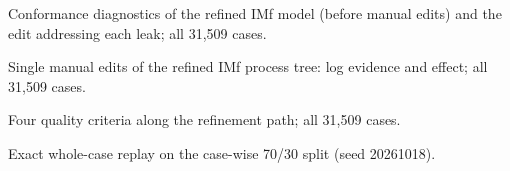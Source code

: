 \begin{table}[t]
\centering
\small
\caption{Conformance diagnostics of the refined IMf model (before manual edits) and the edit addressing each leak; all 31,509 cases.}
\label{tab:conformance-edits}

\end{table}

\begin{table}[t]
\centering
\small
\caption{Single manual edits of the refined IMf process tree: log evidence and effect; all 31,509 cases.}
\label{tab:single-edits}

\end{table}

\begin{table}[t]
\centering
\small
\caption{Four quality criteria along the refinement path; all 31,509 cases.}
\label{tab:final-quality}
\resizebox{\columnwidth}{!}{}
\end{table}
\begin{table}[t]
\centering
\small
\caption{Exact whole-case replay on the case-wise 70/30 split (seed 20261018).}
\label{tab:holdout}
\resizebox{\columnwidth}{!}{}
\end{table}

